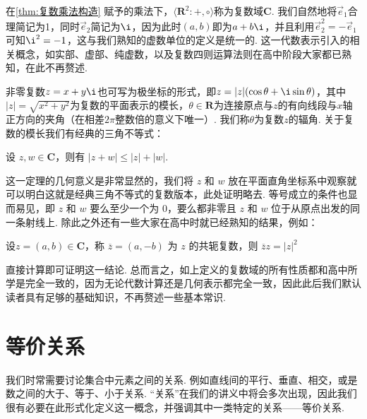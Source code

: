 在\autoref{thm:复数乘法构造} 赋予的乘法下，$\langle\mathbf{R}^2\colon+,\circ\rangle$称为复数域$\mathbf{C}$. 我们自然地将$\vec{e}_1$合理简记为1，同时$\vec{e}_2$简记为$\i$，因为此时$(a,b)$即为$a+b\i$，并且利用$\vec{e}_2^2=-\vec{e}_1$可知$\i^2=-1$，这与我们熟知的虚数单位的定义是统一的. 这一代数表示引入的相关概念，如实部、虚部、纯虚数，以及复数四则运算法则在高中阶段大家都已熟知，在此不再赘述.

非零复数$z=x+y\i$也可写为极坐标的形式，即$z=|z|(\cos\theta+\i\sin\theta)$，其中$|z|=\sqrt{x^2+y^2}$为复数的平面表示的模长，$\theta\in\mathbf{R}$为连接原点与$z$的有向线段与$x$轴正方向的夹角（在相差$2\pi$整数倍的意义下唯一）. 我们称$\theta$为复数$z$的辐角. 关于复数的模长我们有经典的三角不等式：

\begin{theorem}{}{}
    设 $z, w \in \mathbf{C}$，则有 $|z + w| \leqslant |z| + |w|$.
\end{theorem}

这一定理的几何意义是非常显然的，我们将 $z$ 和 $w$ 放在平面直角坐标系中观察就可以明白这就是经典三角不等式的复数版本，此处证明略去. 等号成立的条件也显而易见，即 $z$ 和 $w$ 要么至少一个为 $0$，要么都非零且 $z$ 和 $w$ 位于从原点出发的同一条射线上. 除此之外还有一些大家在高中时就已经熟知的结果，例如：

\begin{theorem}{}{}
    设$z = (a, b) \in \mathbf{C}$，称 $\overline{z} = (a, -b)$ 为 $z$ 的共轭复数，则 $\overline{z} z = |z|^2$
\end{theorem}

直接计算即可证明这一结论. 总而言之，如上定义的复数域的所有性质都和高中所学是完全一致的，因为无论代数计算还是几何表示都完全一致，因此此后我们默认读者具有足够的基础知识，不再赘述一些基本常识.

\section{等价关系}

我们时常需要讨论集合中元素之间的关系. 例如直线间的平行、垂直、相交，或是数之间的大于、等于、小于关系. ``关系''在我们的讲义中将会多次出现，因此我们很有必要在此形式化定义这一概念，并强调其中一类特定的关系——等价关系.

